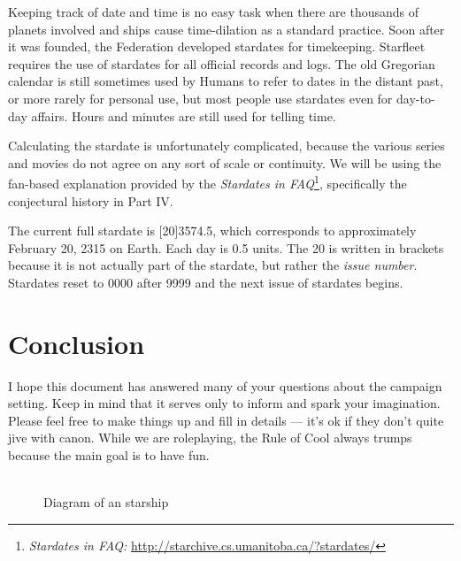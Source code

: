 \documentclass[12pt]{article}
\begin{document}
Keeping track of date and time is no easy task when there are thousands of
planets involved and ships cause time-dilation as a standard practice. Soon
after it was founded, the Federation developed stardates for timekeeping.
Starfleet requires the use of stardates for all official records and logs. The
old Gregorian calendar is still sometimes used by Humans to refer to dates in
the distant past, or more rarely for personal use, but most people use
stardates even for day-to-day affairs. Hours and minutes are still used for
telling time.

Calculating the stardate is unfortunately complicated, because the various
series and movies do not agree on any sort of scale or continuity. We will be
using the fan-based explanation provided by the \emph{Stardates in \StarTrek{}
FAQ}\footnote{\textit{Stardates in \StarTrek{} FAQ:}
\url{http://starchive.cs.umanitoba.ca/?stardates/}}, specifically the
conjectural history in Part IV.

The current full stardate is [20]3574.5, which corresponds to approximately
February 20, 2315 on Earth. Each day is 0.5 units. The 20 is written in
brackets because it is not actually part of the stardate, but rather the
\emph{issue number}. Stardates reset to 0000 after 9999 and the next issue of
stardates begins.

\section{Conclusion}

I hope this document has answered many of your questions about the campaign
setting. Keep in mind that it serves only to inform and spark your imagination.
Please feel free to make things up and fill in details --- it's ok if they
don't quite jive with canon. While we are roleplaying, the Rule of Cool always
trumps because the main goal is to have fun.

\begin{figure}[p]
    \centering
    \\
    \vspace{2ex}
    \footnotesize Diagram of an  starship
\end{figure}
\end{document}
